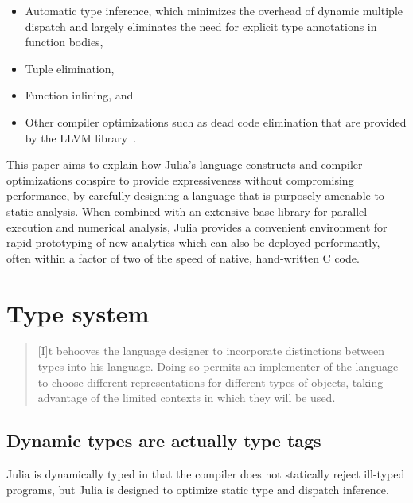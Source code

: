 \documentclass[pldi]{sigplanconf-pldi15}
\begin{document}
\begin{itemize}
	\item Automatic type inference, which minimizes the overhead of dynamic
		multiple dispatch and largely eliminates the need for explicit
		type annotations in function bodies,

	\item Tuple elimination,
	\item Function inlining, and
	\item Other compiler optimizations such as dead code elimination that
		are provided by the LLVM library~\cite{Lattner2004}.
\end{itemize}

This paper aims to explain how Julia's language constructs and compiler
optimizations conspire to provide expressiveness without compromising
performance, by carefully designing a language that is purposely amenable to
static analysis. When combined with an extensive base library for parallel
execution and numerical analysis, Julia provides a convenient environment for
rapid prototyping of new analytics which can also be deployed performantly,
often within a factor of two of the speed of native, hand-written C code.



\section{Type system}

\begin{quote}
	[I]t behooves the language designer to incorporate distinctions between
	types into his language. Doing so permits an implementer of the
	language to choose different representations for different types of
	objects, taking advantage of the limited contexts in which they will be
	used.
\end{quote}

\subsection{Dynamic types are actually type tags}

Julia is dynamically typed in that the compiler does not statically reject
ill-typed programs, but Julia is designed to optimize static type and dispatch
inference.  
\end{document}
